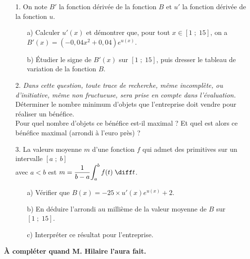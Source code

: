 \begin{itemize}
\item[1.] On note $B'$ la fonction dérivée de la fonction $B$ et $u'$ la fonction dérivée de la fonction $u$. \\

\begin{itemize}
\item[a)] Calculer $u'(x)$ et démontrer que, pour tout $x \in \left[1 \; ; \; 15\right]$, on a $B'(x) = \left(-0,04x^2 + 0,04\right)e^{u(x)}$. \\

\item[b)] Étudier le signe de $B'(x)$ sur $\left[1 \; ; \; 15\right]$, puis dresser le tableau de variation de la fonction $B$. \\
\end{itemize}

\item[2.] \textit{Dans cette question, toute trace de recherche, même incomplète, ou d'initiative, même non fructueuse, sera prise en compte dans l'évaluation.} \\
Déterminer le nombre minimum d'objets que l'entreprise doit vendre pour réaliser un bénéfice. \\
Pour quel nombre d'objets ce bénéfice est-il maximal ? Et quel est alors ce bénéfice maximal (arrondi à l'euro près) ? \\

\item[3.] La valeurs moyenne $m$ d'une fonction $f$ qui admet des primitives sur un intervalle $\left[a \; ; \; b\right]$ \\ avec $a < b$ est $m = \dfrac{1}{b-a}\displaystyle{\int_a^b f(t) \; \diff t}$. \\

\begin{itemize}
\item[a)] Vérifier que $B(x) = -25\times u'(x)e^{u(x)} + 2$. \\

\item[b)] En déduire l'arrondi au millième de la valeur moyenne de $B$ sur $\left[1 \; ; \; 15\right]$. \\

\item[c)] Interpréter ce résultat pour l'entreprise.
\end{itemize}
\end{itemize}

\vspace*{.3cm}


\textbf{À compléter quand M. Hilaire l'aura fait.}

\newpage